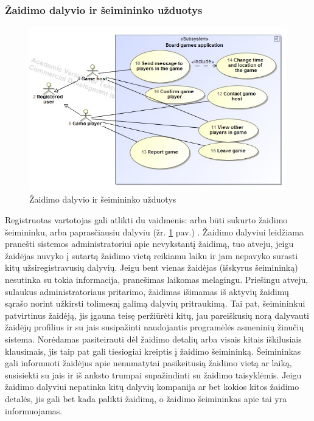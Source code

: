 \documentclass{VUMIFPSkursinis}
\begin{document}
	\subsubsection{Žaidimo dalyvio ir šeimininko užduotys}
		\begin{figure}[H]
			\centering
			\includegraphics[scale=0.5]{img/UzduociuDiagrama2}
			\caption{Žaidimo dalyvio ir šeimininko užduotys}
			\label{img:UzduociuDiagrama2}
		\end{figure}
		Registruotas vartotojas gali atlikti du vaidmenis: arba būti sukurto žaidimo šeimininku, arba paprasčiausiu dalyviu (žr. \ref{img:UzduociuDiagrama2} pav.) . Žaidimo dalyviui leidžiama pranešti sistemos administratoriui apie nevykstantį žaidimą, tuo atveju, jeigu žaidėjas nuvyko į sutartą žaidimo vietą reikiamu laiku ir jam nepavyko surasti kitų užsiregistravusių dalyvių. Jeigu bent vienas žaidėjas (išskyrus šeimininką) nesutinka su tokia informacija, pranešimas laikomas melagingu. Priešingu atveju, sulaukus administratoriaus pritarimo, žaidimas išimamas iš aktyvių žaidimų sąrašo norint užkirsti tolimesnį galimą dalyvių pritraukimą. Tai pat, šeimininkui patvirtinus žaidėją, jis įgauna teisę peržiūrėti kitų, jau pareiškusių norą dalyvauti žaidėjų profilius ir su jais susipažinti naudojantis programėlės asmeninių žinučių sistema. Norėdamas pasiteirauti dėl žaidimo detalių arba visais kitais iškilusiais klausimais, jis taip pat gali tiesiogiai kreiptis į žaidimo šeimininką. Šeimininkas gali informuoti žaidėjus apie nenumatytai pasikeitusią žaidimo vietą ar laiką, susisiekti su jais ir iš anksto trumpai supažindinti su žaidimo taisyklėmis. Jeigu žaidimo dalyviui nepatinka kitų dalyvių kompanija ar bet kokios kitos žaidimo detalės, jis gali bet kada palikti žaidimą, o žaidimo šeimininkas apie tai yra informuojamas.
\end{document}
